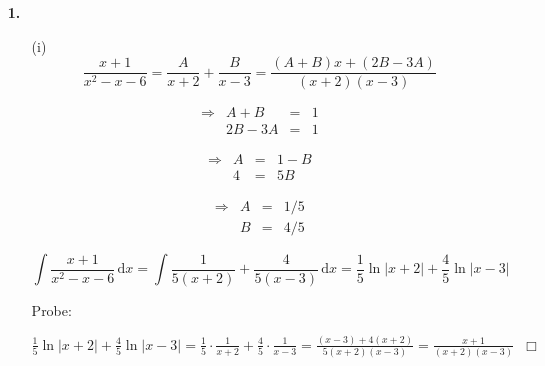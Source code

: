 \documentclass[a4paper,11pt,fleqn]{scrartcl}
\author{\authorinfo}
\title{\titleinfo}
\date{\today}
\newcommand{\dX}[1]{\, \mathrm{d}#1}
\newcommand{\dx}[0]{\dX{x}}
\begin{document}
\maketitle
\begin{enumerate}
    \item[\textbf{1.}]
        \begin{enumerate}
            \item[(i)]
                \[ \frac{x+1}{x^2-x-6} = \frac{A}{x+2} + \frac{B}{x-3} = \frac{(A+B)x + (2B - 3A)}{(x+2)(x-3)} \]
                \begin{multicols}{3}
                    \[\begin{array}{lrcl}
                        \Rightarrow & A + B &=& 1\\
                        & 2B - 3A &=& 1
                    \end{array}\]

                    \[\begin{array}{lrcl}
                        \Rightarrow & A &=& 1 - B\\
                        & 4 &=& 5B
                    \end{array}\]

                    \[\begin{array}{lrcl}
                        \Rightarrow & A &=& 1 / 5\\
                        & B &=& 4 / 5
                    \end{array}\]
                \end{multicols}

                \[ \int \frac{x+1}{x^2-x-6} \dx = \int \frac{1}{5(x+2)} + \frac{4}{5(x-3)} \dx = \frac{1}{5} \ln |x+2| + \frac{4}{5} \ln |x-3| \]

                Probe:

                \( \frac{1}{5} \ln |x+2| + \frac{4}{5} \ln |x-3| = \frac{1}{5} \cdot \frac{1}{x+2} + \frac{4}{5} \cdot \frac{1}{x-3} = \frac{(x-3)+4(x+2)}{5(x+2)(x-3)} = \frac{x + 1}{(x+2)(x-3)} \;\;\Box \)


\end{enumerate}
\end{enumerate}
\end{document}
